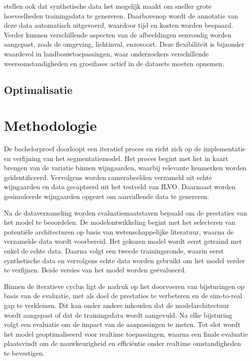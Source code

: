 \textcite{Anderson2022} stellen ook dat synthetische data het mogelijk maakt om sneller grote hoeveelheden trainingsdata te genereren. Daarbovenop wordt de annotatie van deze data automatisch uitgevoerd, waardoor tijd en kosten worden bespaard. Verder kunnen verschillende aspecten van de afbeeldingen eenvoudig worden aangepast, zoals de omgeving, lichtinval, enzovoort. Deze flexibiliteit is bijzonder waardevol in landbouwtoepassingen, waar onderzoekers verschillende weersomstandigheden en groeifases actief in de datasets moeten opnemen.

\subsection{Optimalisatie}



\section{Methodologie}%
\label{sec:methodologie}

De bachelorproef doorloopt een iteratief proces en richt zich op de implementatie en verfijning van het segmentatiemodel. Het proces begint met het in kaart brengen van de variatie binnen wijngaarden, waarbij relevante kenmerken worden geïdentificeerd. Vervolgens worden camerabeelden verzameld uit echte wijngaarden en data gecapteerd uit het testveld van ILVO. Daarnaast worden gesimuleerde wijngaarden opgezet om aanvullende data te genereren.

Na de dataverzameling worden evaluatiemaatstaven bepaald om de prestaties van het model te beoordelen. De modelontwikkeling begint met het selecteren van potentiële architecturen op basis van wetenschappelijke literatuur, waarna de verzamelde data wordt voorbereid. Het gekozen model wordt eerst getraind met enkel de echte data. Daarna volgt een tweede trainingsronde, waarin eerst synthetische data en vervolgens echte data worden gebruikt om het model verder te verfijnen. Beide versies van het model worden geëvalueerd.

Binnen de iteratieve cyclus ligt de nadruk op het doorvoeren van bijsturingen op basis van de evaluatie, met als doel de prestaties te verbeteren en de sim-to-real gap te verkleinen. Dit kan onder andere inhouden dat de modelarchitectuur wordt aangepast of dat de trainingsdata wordt aangevuld. Na elke bijsturing volgt een evaluatie om de impact van de aanpassingen te meten. Tot slot wordt het model geoptimaliseerd voor realtime toepassingen, waarna een finale evaluatie plaatsvindt om de nauwkeurigheid en efficiëntie onder realtime omstandigheden te bevestigen.

